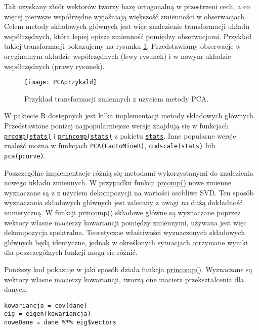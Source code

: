 \documentclass[polish,]{book}
\begin{document}
Tak uzyskany zbiór wektorów tworzy bazę ortogonalną w przestrzeni cech, a co
więcej pierwsze współrzędne wyjaśniają większość zmienności w obserwacjach. Celem metody składowych głównych jest więc znalezienie transformacji układu współrzędnych, która lepiej opisze zmienność pomiędzy obserwacjami. Przykład takiej
transformacji pokazujemy na rysunku \ref{fig:PCA}. Przedstawiamy obserwacje w oryginalnym układzie współrzędnych (lewy rysunek) i w nowym układzie współrzędnych
(prawy rysunek).

\begin{figure}

{\centering \texttt{[image: PCAprzykald]} 

}

\caption{Przykład transformacji zmiennych z użyciem metody PCA.}\label{fig:PCA}
\end{figure}

W pakiecie R dostępnych jest kilka implementacji metody składowych głównych.
Przedstawione poniżej najpopularniejsze wersje znajdują się w funkcjach \href{https://rdrr.io/r/stats/prcomp.html}{\texttt{prcomp(stats)}}
i \href{https://rdrr.io/r/stats/princomp.html}{\texttt{princomp(stats)}} z pakietu \href{https://rdrr.io/r/\#stats}{\texttt{stats}}. Inne popularne wersje znaleźć można w funkcjach \href{https://rdrr.io/cran/FactoMineR/man/PCA.html}{\texttt{PCA(FactoMineR)}}, \href{https://rdrr.io/r/stats/cmdscale.html}{\texttt{cmdscale(stats)}} lub \texttt{pca(pcurve)}.

Poszczególne implementacje różnią się metodami wykorzystanymi do znalezienia
nowego układu zmiennych. W przypadku funkcji \href{https://rdrr.io/r/stats/princomp.html}{prcomp()} nowe zmienne wyznaczane są z z użyciem dekompozycji na wartości osobliwe SVD. Ten sposób wyznaczania
składowych głównych jest zalecany z uwagi na dużą dokładność numeryczną. W
funkcji \href{https://rdrr.io/r/stats/princomp.html}{princomp()} składowe główne są wyznaczane poprzez wektory własne macierzy kowariancji pomiędzy zmiennymi, używana jest więc dekompozycja spektralna.
Teoretyczne właściwości wyznaczonych składowych głównych będą identyczne, jednak w określonych sytuacjach otrzymane wyniki dla poszczególnych funkcji mogą
się różnić.

Poniższy kod pokazuje w jaki sposób działa funkcja \href{https://rdrr.io/r/stats/princomp.html}{princomp()}. Wyznaczane
są wektory własne macierzy kowariancji, tworzą one macierz przekształcenia dla
danych.

\begin{verbatim}
kowariancja = cov(dane)
eig = eigen(kowariancja)
noweDane = dane %*% eig$vectors
\end{verbatim}
\end{document}
